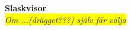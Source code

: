 \begin{center}
    \vspace*{1.5cm}
    {\fontsize{20}{20}\textbf{Slaskvisor}}\\
    \vspace{0.7cm}
    {\fontsize{12}{12}\colorbox{yellow}{\textit{Om ...(drägget???) själv får välja}}}
\end{center}
\noBackground

\newpage
\noBackground


